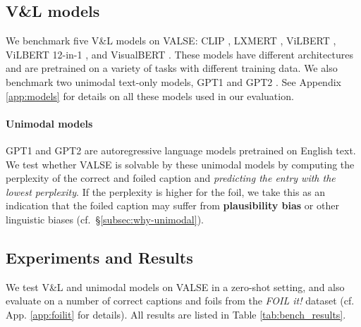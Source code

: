 \documentclass[11pt]{article}
\newcommand{\dataset}{VALSE}
\begin{document}
\subsection{V\&L models}\label{subsec:vl_models}

We benchmark five V\&L models on VALSE: CLIP \citep{radford2021learning}, LXMERT \citep{tan-bansal-2019-lxmert}, ViLBERT \citep{lu2019vilbert}, ViLBERT 12-in-1 \citep{lu2020vilbert12in1}, and VisualBERT \citep{li2019visualbert}. These models have different architectures and are pretrained on a variety of tasks
with
different training data. We also benchmark two unimodal text-only models, GPT1 \citep{radford2018improving} and GPT2 \citep{radford2019language}. 
See Appendix \ref{app:models} for details on all these models used in our evaluation.













\paragraph{Unimodal models} GPT1 and GPT2
are
autoregressive language models pretrained on English text. We test whether \dataset{} is solvable by these unimodal models by computing the perplexity of the correct and foiled caption and \textit{predicting the entry with the lowest perplexity}. 
If the perplexity is higher for the foil, 
we take this as an indication that the foiled caption may suffer from \textbf{plausibility bias} or other linguistic biases (cf.\ \S \ref{subsec:why-unimodal}).

\subsection{Experiments and Results}
\label{subsec:experiments}
We test V\&L and unimodal models on \dataset{} in a zero-shot setting, 
and also evaluate on a number of correct captions and foils from the \textit{FOIL it!} dataset \cite{shekhar-etal-2017-foil} (cf. App. \ref{app:foilit} for details).
All results are listed in Table \ref{tab:bench_results}.
\end{document}
